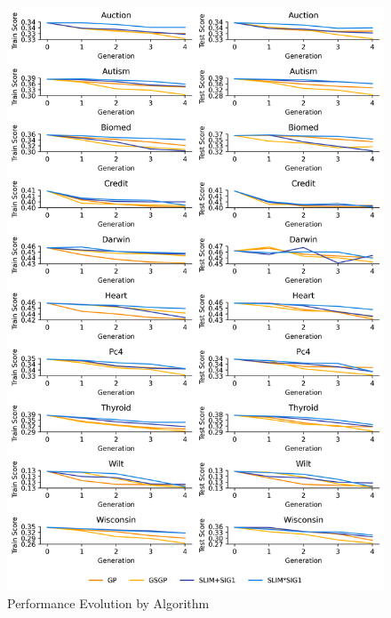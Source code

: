 
    \begin{figure}[H]
    \centering
    \includegraphics[width=\linewidth]{../Latex/Chapters/Figures/Results/comparison_test_performance_evolution.png}
    \caption{Performance Evolution by Algorithm}
    \label{fig:comparison_test_performance_evolution}
    \end{figure}
    